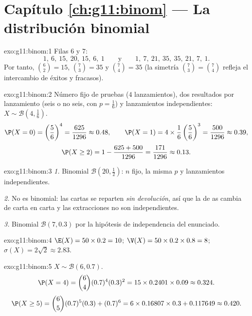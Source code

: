 \section*{Capítulo \ref{ch:g11:binom} --- La distribución binomial}

\begin{solution}{exo:g11:binom:1}
Filas $6$ y $7$:
\[
1,\ 6,\ 15,\ 20,\ 15,\ 6,\ 1
\qquad\text{y}\qquad
1,\ 7,\ 21,\ 35,\ 35,\ 21,\ 7,\ 1 .
\]
Por tanto, $\binom62 = 15$, $\binom73 = 35$ y $\binom74 = 35$ (la simetría
$\binom73 = \binom74$ refleja el intercambio de éxitos y fracasos).
\end{solution}

\begin{solution}{exo:g11:binom:2}
Número fijo de pruebas ($4$ lanzamientos), dos resultados por lanzamiento
(seis o no seis, con $p = \frac16$) y lanzamientos independientes:
$X \sim \mathcal B(4, \frac16)$.
\[
\P(X=0) = \left(\frac56\right)^4 = \frac{625}{1296} \approx 0.48,
\qquad
\P(X=1) = 4 \times \frac16\left(\frac56\right)^3 = \frac{500}{1296}
\approx 0.39,
\]
\[
\P(X \geq 2) = 1 - \frac{625 + 500}{1296} = \frac{171}{1296}
\approx 0.13 .
\]
\end{solution}

\begin{solution}{exo:g11:binom:3}
\emph{1.} Binomial $\mathcal B(20, \frac12)$: $n$ fijo, la misma $p$ y
lanzamientos independientes.

\emph{2.} No es binomial: las cartas se reparten \emph{sin devolución},
así que la  de as cambia de carta en carta y las extracciones
no son independientes.

\emph{3.} Binomial $\mathcal B(7, 0.3)$ por la hipótesis de independencia
del enunciado.
\end{solution}

\begin{solution}{exo:g11:binom:4}
$\E(X) = 50 \times 0.2 = 10$; $\V(X) = 50 \times 0.2 \times 0.8 = 8$;
$\sigma(X) = 2\sqrt2 \approx 2.83$.
\end{solution}

\begin{solution}{exo:g11:binom:5}
$X \sim \mathcal B(6, 0.7)$.
\[
\P(X = 4) = \binom64 (0.7)^4 (0.3)^2 = 15 \times 0.2401 \times 0.09
\approx 0.324 .
\]
\[
\P(X \geq 5) = \binom65 (0.7)^5(0.3) + (0.7)^6
= 6 \times 0.16807 \times 0.3 + 0.117649 \approx 0.420 .
\]
\end{solution}


